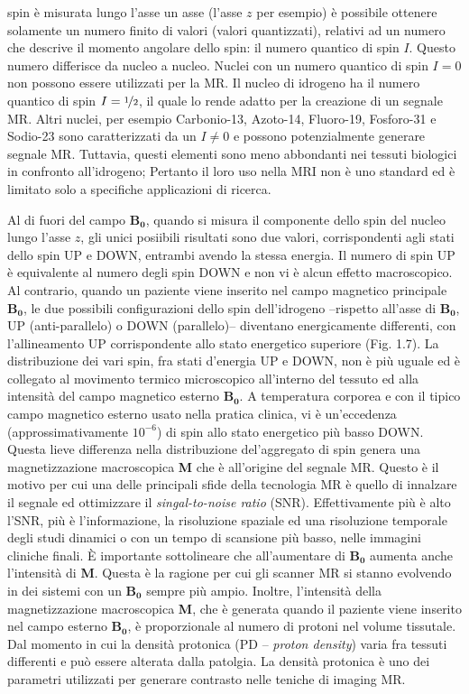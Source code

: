 \documentclass[leqno,10pt,twocolumn,a4paper]{article}
\begin{document}
	spin è misurata lungo l'asse un asse (l'asse $z$ per esempio) è possibile ottenere solamente un numero finito di valori (valori quantizzati), relativi ad un numero che descrive il momento angolare dello spin: il numero 
	quantico di spin $I$. Questo numero differisce da nucleo a nucleo. Nuclei con un numero quantico di spin $I=0$ non possono essere utilizzati per la MR. Il nucleo di idrogeno ha il numero quantico di spin $I=\nicefrac{1}{2}$,
	il quale lo rende adatto per la creazione di un segnale MR. Altri nuclei, per esempio Carbonio-13, Azoto-14, Fluoro-19, Fosforo-31 e Sodio-23 sono caratterizzati da un $I\neq 0$ e possono potenzialmente generare 
	segnale MR. Tuttavia, questi elementi sono meno abbondanti nei tessuti biologici in confronto all'idrogeno; Pertanto il loro uso nella MRI non è uno standard ed è limitato solo a specifiche applicazioni di ricerca.
	\par Al di fuori del campo $\boldsymbol{B_0}$, quando si misura il componente dello spin del nucleo lungo l'asse $z$, gli unici posiibili risultati sono due valori, corrispondenti agli stati dello spin UP e DOWN, entrambi
	avendo la stessa energia. Il numero di spin UP è equivalente al numero degli spin DOWN e non vi è alcun effetto macroscopico. Al contrario, quando un paziente viene inserito nel campo magnetico principale $\boldsymbol{B_0}$,
	le due possibili configurazioni dello spin dell'idrogeno --rispetto all'asse di $\boldsymbol{B_0}$, UP (anti-parallelo) o DOWN (parallelo)-- diventano energicamente differenti, con l'allineamento UP corrispondente allo stato
	energetico superiore (Fig. 1.7). La distribuzione dei vari spin, fra stati d'energia UP e DOWN, non è più uguale ed è collegato al movimento termico microscopico all'interno del tessuto ed alla intensità del campo magnetico 
	esterno $\boldsymbol{B_0}$. A temperatura corporea e con il tipico campo magnetico esterno usato nella pratica clinica, vi è un'eccedenza (approssimativamente $10^{-6}$) di spin allo stato energetico più basso DOWN.
	Questa lieve differenza nella distribuzione del'aggregato di spin genera una magnetizzazione macroscopica \textbf{M} che è all'origine del segnale MR. Questo è il motivo per cui una delle principali sfide della tecnologia MR
	è quello di innalzare il segnale ed ottimizzare il \textit{singal-to-noise ratio} (SNR). Effettivamente più è alto l'SNR, più è l'informazione, la risoluzione spaziale ed una risoluzione temporale degli studi dinamici o con un tempo di
	scansione più basso, nelle immagini cliniche finali. %
	È importante sottolineare che all'aumentare di $\boldsymbol{B_0}$ aumenta anche l'intensità di \textbf{M}. Questa è la ragione per cui gli scanner MR si stanno evolvendo in dei sistemi con un $\boldsymbol{B_0}$ sempre più
	ampio. Inoltre, l'intensità della magnetizzazione macroscopica \textbf{M}, che è generata quando il paziente viene inserito nel campo esterno $\boldsymbol{B_0}$, è proporzionale al numero di protoni nel volume tissutale.
	Dal momento in cui la densità protonica (PD -- \textit{proton density}) varia fra tessuti differenti e può essere alterata dalla patolgia. La densità protonica è uno dei parametri utilizzati per generare contrasto nelle teniche di
	imaging MR.
\end{document}
